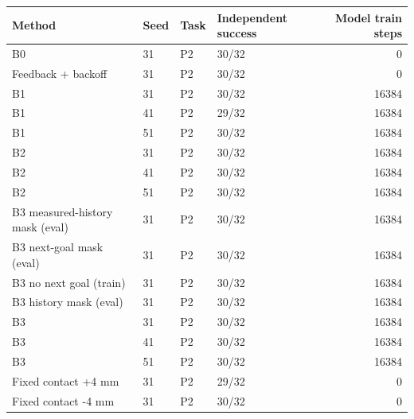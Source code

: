 \begin{tabular}{llllr}
\toprule
Method & Seed & Task & Independent success & Model train steps \\
\midrule
B0 & 31 & P2 & 30/32 & 0 \\
Feedback + backoff & 31 & P2 & 30/32 & 0 \\
B1 & 31 & P2 & 30/32 & 16384 \\
B1 & 41 & P2 & 29/32 & 16384 \\
B1 & 51 & P2 & 30/32 & 16384 \\
B2 & 31 & P2 & 30/32 & 16384 \\
B2 & 41 & P2 & 30/32 & 16384 \\
B2 & 51 & P2 & 30/32 & 16384 \\
B3 measured-history mask (eval) & 31 & P2 & 30/32 & 16384 \\
B3 next-goal mask (eval) & 31 & P2 & 30/32 & 16384 \\
B3 no next goal (train) & 31 & P2 & 30/32 & 16384 \\
B3 history mask (eval) & 31 & P2 & 30/32 & 16384 \\
B3 & 31 & P2 & 30/32 & 16384 \\
B3 & 41 & P2 & 30/32 & 16384 \\
B3 & 51 & P2 & 30/32 & 16384 \\
Fixed contact +4 mm & 31 & P2 & 29/32 & 0 \\
Fixed contact -4 mm & 31 & P2 & 30/32 & 0 \\
\bottomrule
\end{tabular}
